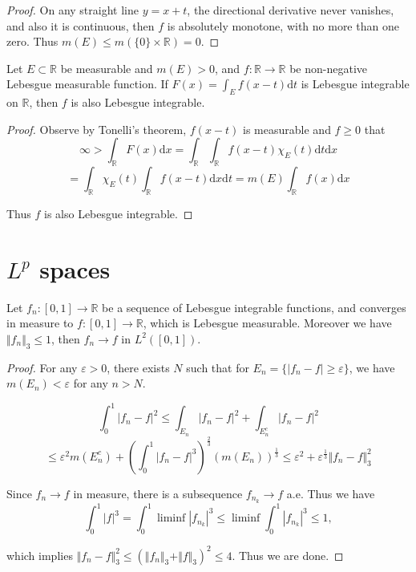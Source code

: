 \begin{proof}
	On any straight line $ y=x+t $, the directional derivative never vanishes, and also it is continuous, then $ f $ is absolutely monotone, with no more than one zero. Thus $ m(E)\le m(\{0\}\times \mathbb{R} )=0 $.
\end{proof}

\begin{problem}
Let $ E\subset \mathbb{R}  $ be measurable and $ m(E)>0 $, and $ f\colon\mathbb{R} \to \mathbb{R}  $ be non-negative Lebesgue measurable function. If $ F(x)=\int _{E}f(x-t)\mathrm{d} t $ is Lebesgue integrable on $ \mathbb{R}  $, then $ f $ is also Lebesgue integrable.
\end{problem}

\begin{proof}
	Observe by Tonelli's theorem, $ f(x-t) $ is measurable and $ f\ge 0 $ that
	$$
	\infty >\int_{\mathbb{R}}^{}{F( x ) \mathrm{d} x}=\int_{\mathbb{R}}^{}{\int_{\mathbb{R}}^{}{f( x-t ) \chi _E( t ) \mathrm{d} t}\mathrm{d} x}
	$$
	$$
	=\int_{\mathbb{R}}^{}{\chi _E( t ) \int_{\mathbb{R}}^{}{f( x-t ) \mathrm{d} x}\mathrm{d} t}=m( E ) \int_{\mathbb{R}}^{}{f( x ) \mathrm{d} x}
	$$
	
	Thus $ f $ is also Lebesgue integrable.
\end{proof}

\section*{$ L^{p} $ spaces}

\begin{problem}
Let $ f_{n}\colon[0,1]\to \mathbb{R}  $ be a sequence of Lebesgue integrable functions, and converges in measure to $ f\colon [0,1]\to \mathbb{R}  $, which is Lebesgue measurable. Moreover we have $ \Vert f_{n} \Vert_{3}\le 1 $, then $ f_{n}\to f $ in $ L^{2}([0,1]) $.
\end{problem}

\begin{proof}
	For any $ \varepsilon>0 $, there exists $ N $ such that for $ E_{n}=\{|f_{n}-f|\ge \varepsilon\} $, we have $ m(E_{n})<\varepsilon $ for any $ n>N $.
	
	$$
	\int_0^1{|f_n-f|^2}\le \int_{E_n}^{}{|f_n-f|^2}+\int_{E_{n}^{c}}^{}{|f_n-f|^2}
	$$
	$$
	\le \varepsilon ^2m( E_{n}^{c} ) +\left( \int_0^1{|f_n-f|^3} \right) ^{\frac{2}{3}}( m( E_n ) ) ^{\frac{1}{3}}
	\le \varepsilon ^2+\varepsilon ^{\frac{1}{3}}\Vert f_n-f \Vert_{3}^{2}
	$$
	
	Since $ f_{n}\to f $ in measure, there is a subsequence $ f_{n_{k}}\to f $ a.e. Thus we have
	$$
	\int_0^1{|f|^3}=\int_0^1{\liminf|f_{n_k}|^3}\le \liminf\int_0^1{|f_{n_k}|^3}\le 1,
	$$
	
	which implies $ \Vert f_n-f \Vert_{3}^{2}\le (\Vert f_{n} \Vert_{3}+\Vert f \Vert_{3})^{2}\le 4 $. Thus we are done.
\end{proof}

